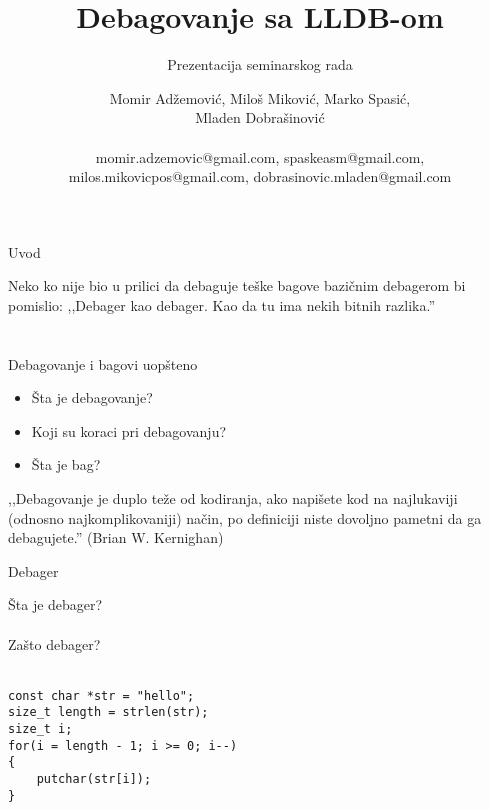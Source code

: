 \documentclass[bookmarks=true,bookmarksopen=true,pdfborder={0 0 0},pdfhighlight={/N},linkbor
dercolor={.5 .5 .5},implicit=false,unicode
]{beamer}
\begin{document}
\title{Debagovanje sa LLDB-om}
\author{Momir Adžemović, Miloš Miković, Marko Spasić,\\ Mladen Dobrašinović\\~\\\small momir.adzemovic@gmail.com, spaskeasm@gmail.com,\\ \small milos.mikovicpos@gmail.com, dobrasinovic.mladen@gmail.com}
\subtitle{Prezentacija seminarskog rada}
\date{}


\begin{frame}
  
  \titlepage{}
  
\end{frame}

\begin{frame}{Uvod}
  
  Neko ko nije bio u prilici da debaguje teške bagove bazičnim debagerom bi pomislio: ,,Debager kao debager. Kao da tu ima nekih bitnih razlika.''

\end{frame}

\section{}
\begin{frame}{Debagovanje i bagovi uopšteno}
  \begin{itemize}
  \item Šta je debagovanje?
  \item Koji su koraci pri debagovanju?
  \item Šta je bag?
  \end{itemize}
  ,,Debagovanje je duplo teže od kodiranja, ako napišete kod na najlukaviji (odnosno najkomplikovaniji) način, po definiciji niste dovoljno pametni da ga debagujete.'' (Brian W. Kernighan)
\end{frame}

\begin{frame}[fragile]{Debager}

  Šta je debager?\\~\\

  Zašto debager?\\~\\
  
    \begin{lstlisting}
const char *str = "hello";
size_t length = strlen(str);
size_t i;
for(i = length - 1; i >= 0; i--)
{
    putchar(str[i]);
}
  \end{lstlisting}
\end{frame}
\end{document}
